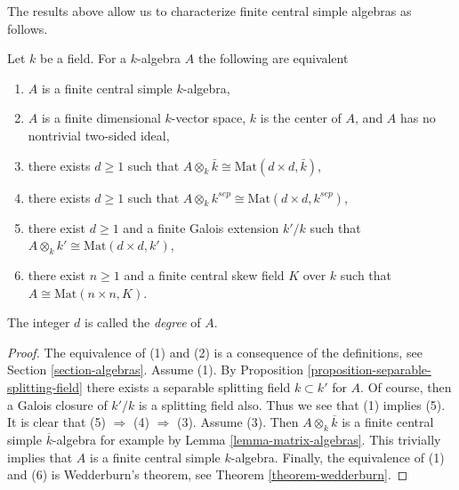 \noindent
The results above allow us to characterize finite central simple algebras
as follows.

\begin{lemma}
\label{lemma-finite-central-simple-algebra}
Let $k$ be a field. For a $k$-algebra $A$ the following are equivalent
\begin{enumerate}
\item $A$ is a finite central simple $k$-algebra,
\item $A$ is a finite dimensional $k$-vector space, $k$ is the center of $A$,
and $A$ has no nontrivial two-sided ideal,
\item there exists $d \geq 1$ such that
$A \otimes_k \bar k \cong \text{Mat}(d \times d, \bar k)$,
\item there exists $d \geq 1$ such that
$A \otimes_k k^{sep} \cong \text{Mat}(d \times d, k^{sep})$,
\item there exist $d \geq 1$ and a finite Galois extension $k'/k$
such that
$A \otimes_k k' \cong \text{Mat}(d \times d, k')$,
\item there exist $n \geq 1$ and a finite central skew field $K$
over $k$ such that $A \cong \text{Mat}(n \times n, K)$.
\end{enumerate}
The integer $d$ is called the {\it degree} of $A$.
\end{lemma}

\begin{proof}
The equivalence of (1) and (2) is a consequence of the definitions, see
Section \ref{section-algebras}.
Assume (1). By
Proposition \ref{proposition-separable-splitting-field}
there exists a separable splitting field $k \subset k'$ for $A$.
Of course, then a Galois closure of $k'/k$ is a splitting field also.
Thus we see that (1) implies (5). It is clear that (5) $\Rightarrow$ (4)
$\Rightarrow$ (3). Assume (3). Then $A \otimes_k \overline{k}$
is a finite central simple $\overline{k}$-algebra for example by
Lemma \ref{lemma-matrix-algebras}.
This trivially implies that $A$ is a finite central simple $k$-algebra.
Finally, the equivalence of (1) and (6) is Wedderburn's theorem, see
Theorem \ref{theorem-wedderburn}.
\end{proof}
















